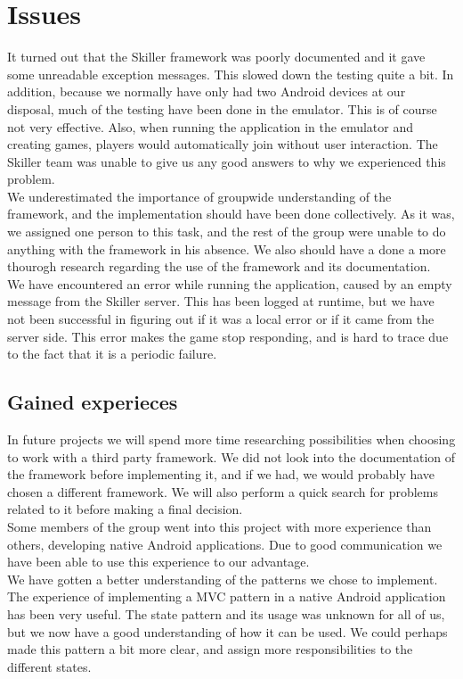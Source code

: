 \section{Issues}


It turned out that the Skiller framework was poorly documented and it gave some unreadable exception messages. This slowed down the testing quite a bit. In addition, because we normally have only had two Android devices at our disposal, much of the testing have been done in the emulator. This is of course not very effective. Also, when running the application in the emulator and creating games, players would automatically join without user interaction. The Skiller team was unable to give us any good answers to why we experienced this problem.\\

We underestimated the importance of groupwide understanding of the framework, and the implementation should have been done collectively. As it was, we assigned one person to this task, and the rest of the group were unable to do anything with the framework in his absence. We also should  have a done a more thourogh research regarding the use of the framework and its documentation. \\

We have encountered an error while running the application, caused by an empty message from the Skiller server. This has been logged at runtime, but we have not been successful in figuring out if it was a local error or if it came from the server side. This error makes the game stop responding, and is hard to trace due to the fact that it is a periodic failure. \\

\subsection{Gained experieces}
In future projects we will spend more time researching possibilities when choosing to work with a third party framework. We did not look into the documentation of the framework before implementing it, and if we had, we would probably have chosen a different framework. We will also perform a quick search for problems related to it before making a final decision.  \\

Some members of the group went into this project with more experience than others, developing native Android applications. Due to good communication we have been able to use this experience to our advantage. \\

We have gotten a better understanding of the patterns we chose to implement. The experience of implementing a MVC pattern in a native Android application has been very useful. The state pattern and its usage was unknown for all of us, but we now have a good understanding of how it can be used. We could perhaps made this pattern a bit more clear, and assign more responsibilities to the different states.